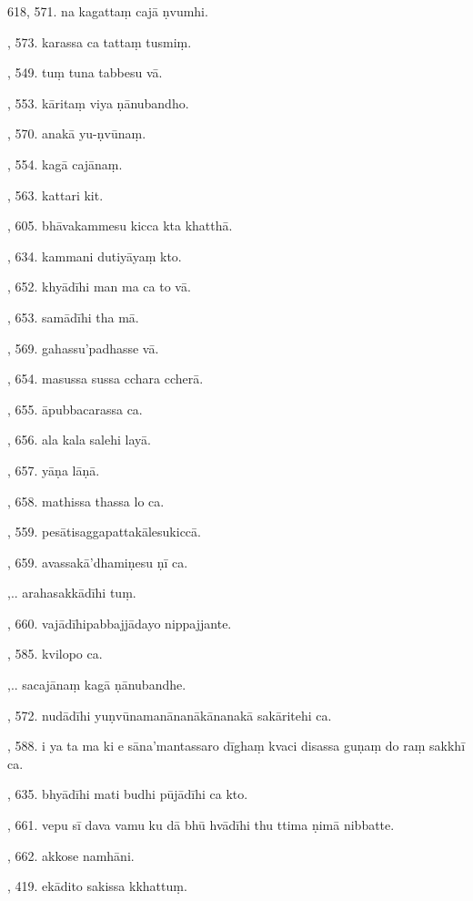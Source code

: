 618, 571. na kagattaṃ cajā ṇvumhi.\par {}, 573. karassa ca tattaṃ tusmiṃ.\par {}, 549. tuṃ tuna tabbesu vā.\par {}, 553. kāritaṃ viya ṇānubandho.\par {}, 570. anakā yu-ṇvūnaṃ.\par {}, 554. kagā cajānaṃ.\par {}, 563. kattari kit.\par {}, 605. bhāvakammesu kicca kta khatthā.\par {}, 634. kammani dutiyāyaṃ kto.\par {}, 652. khyādīhi man ma ca to vā.\par {}, 653. samādīhi tha mā.\par {}, 569. gahassu’padhasse vā.\par {}, 654. masussa sussa cchara ccherā.\par {}, 655. āpubbacarassa ca.\par {}, 656. ala kala salehi layā.\par {}, 657. yāṇa lāṇā.\par {}, 658. mathissa thassa lo ca.\par {}, 559. pesātisaggapattakālesukiccā.\par {}, 659. avassakā’dhamiṇesu ṇī ca.\par {},.. arahasakkādīhi tuṃ.\par {}, 660. vajādīhipabbajjādayo nippajjante.\par {}, 585. kvilopo ca.\par {},.. sacajānaṃ kagā ṇānubandhe.\par {}, 572. nudādīhi yuṇvūnamanānanākānanakā sakāritehi ca.\par {}, 588. i ya ta ma ki e sāna’mantassaro dīghaṃ kvaci disassa guṇaṃ do raṃ sakkhī ca.\par {}, 635. bhyādīhi mati budhi pūjādīhi ca kto.\par {}, 661. vepu sī dava vamu ku dā bhū hvādīhi thu ttima ṇimā nibbatte.\par {}, 662. akkose namhāni.\par {}, 419. ekādito sakissa kkhattuṃ.\par \noindent
